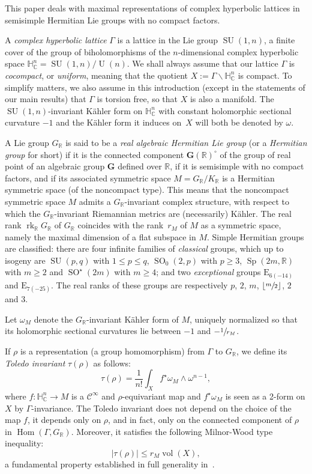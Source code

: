 \documentclass[10pt]{amsart}
\let\mathcal\mathscr
\theoremstyle{plain}
\theoremstyle{definition}
\DeclareMathOperator{\Hom}{Hom}
\DeclareMathOperator{\rk}{rk}
\DeclareMathOperator{\SO}{SO}
\DeclareMathOperator{\SU}{SU}
\DeclareMathOperator{\Sp}{Sp}
\DeclareMathOperator{\rU}{U}
\DeclareMathOperator{\vol}{vol}
\newcommand{\cC}{\mathcal{C}}
\newcommand{\bR}{\mathbb{R}}
\newcommand{\HC}{{\mathbb{H}^n_\mathbb{C}}}
\newcommand{\bfG}{\boldsymbol{G}}
\newcommand{\rkm}{{r_M}}
\begin{document}
This paper deals with maximal representations of complex hyperbolic lattices in semisimple Hermitian
Lie groups with no compact factors.

A \emph{complex hyperbolic lattice} $\Gamma$ is a lattice in the Lie group $\SU(1,n)$, a finite
cover of the group of biholomorphisms of the $n$-dimensional complex hyperbolic space
$\HC=\SU(1,n)/\rU(n)$.
We shall always
assume that our lattice $\Gamma$ is \emph{cocompact}, or \emph{uniform}, meaning that the quotient
$X:=\Gamma\backslash\HC$ is
compact. To simplify matters, we also assume in this introduction (except in the statements of
our main results) that $\Gamma$ is torsion free, so that $X$ is also a
manifold. The
$\SU(1,n)$-invariant Kähler form on $\HC$ with constant holomorphic sectional curvature $-1$ and the
Kähler form it induces on~$X$ will both be
denoted by $\omega$.

A Lie group $G_\bR$ is said to be a \emph{real algebraic Hermitian Lie group} (or a \emph{Hermitian
group} for short) if it is the connected component $\bfG(\bR)^\circ$ of the
group of real point of an algebraic group $\bfG$ defined over $\bR$, if it is semisimple
with no compact factors, and if its
associated symmetric space $M=G_\bR/K_\bR$ is a Hermitian symmetric space
(of the noncompact type).
This means that the noncompact symmetric space $M$ admits a
$G_\bR$-invariant complex structure, with respect to which the $G_\bR$-invariant Riemannian metrics
are (necessarily) Kähler. The real rank $\rk_\bR G_\bR$ of
$G_\bR$ coincides with the rank~$\rkm$ of $M$ as a symmetric space, namely the maximal dimension of
a flat subspace in $M$. Simple Hermitian groups are classified: there are four
infinite families of \emph{classical} groups, which up to isogeny are $\SU(p,q)$ with $1\leq p\leq
q$, $\SO_0(2,p)$ with $p\geq 3$, $\Sp(2m,\bR)$ with $m\geq 2$ and
$\SO^\star(2m)$ with $m\geq 4$; and two \emph{exceptional} groups $\mathrm{E}_{6(-14)}$ and
$\mathrm{E}_{7(-25)}$. The real ranks of these groups are respectively
$p$, $2$, $m$, $\lfloor \sfrac m2 \rfloor$, $2$ and $3$.

Let $\omega_M$ denote the $G_\bR$-invariant Kähler form of
$M$, uniquely normalized so that its holomorphic sectional curvatures lie between $-1$ and
$-\sfrac 1{\rkm}$.

If $\rho$ is a representation (a group homomorphism) from $\Gamma$ to $G_\bR$, we
define its \emph{Toledo invariant} $\tau(\rho)$ as follows:
$$
\tau(\rho)=\frac 1{n!}\int_X f^\star\omega_M\wedge\omega^{n-1},
$$
where $f:\HC\to M$ is a $\cC^\infty$ and $\rho$-equivariant map and $f^\star\omega_M$ is seen as a 2-form on $X$ by
$\Gamma$-invariance. The Toledo invariant does not depend on the choice of the map $f$, it depends only
on $\rho$, and in fact, only on the connected component of $\rho$ in $\Hom(\Gamma,G_\bR)$. Moreover, it
satisfies the following Milnor-Wood type inequality:
$$
|\tau(\rho)|\leq \rkm\vol(X),
$$
a fundamental property established in full generality in~\cite{BI07}.
\end{document}
